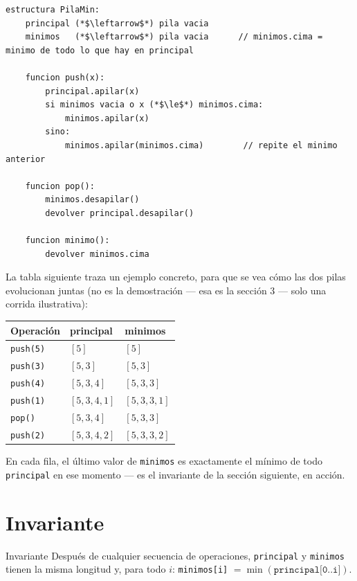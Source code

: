 \documentclass[11pt]{article}
\begin{document}
\begin{lstlisting}[style=pseudo]
estructura PilaMin:
    principal (*$\leftarrow$*) pila vacia
    minimos   (*$\leftarrow$*) pila vacia      // minimos.cima = minimo de todo lo que hay en principal

    funcion push(x):
        principal.apilar(x)
        si minimos vacia o x (*$\le$*) minimos.cima:
            minimos.apilar(x)
        sino:
            minimos.apilar(minimos.cima)        // repite el minimo anterior

    funcion pop():
        minimos.desapilar()
        devolver principal.desapilar()

    funcion minimo():
        devolver minimos.cima
\end{lstlisting}

La tabla siguiente traza un ejemplo concreto, para que se vea cómo las dos pilas evolucionan juntas (no
es la demostración --- esa es la sección 3 --- solo una corrida ilustrativa):

\begin{center}
\begin{tabular}{@{}lll@{}}
\toprule
\textbf{Operación} & \textbf{principal} & \textbf{minimos} \\
\midrule
\texttt{push(5)} & $[5]$ & $[5]$ \\
\texttt{push(3)} & $[5,3]$ & $[5,3]$ \\
\texttt{push(4)} & $[5,3,4]$ & $[5,3,3]$ \\
\texttt{push(1)} & $[5,3,4,1]$ & $[5,3,3,1]$ \\
\texttt{pop()} & $[5,3,4]$ & $[5,3,3]$ \\
\texttt{push(2)} & $[5,3,4,2]$ & $[5,3,3,2]$ \\
\bottomrule
\end{tabular}
\end{center}

En cada fila, el último valor de \texttt{minimos} es exactamente el mínimo de todo \texttt{principal} en
ese momento --- es el invariante de la sección siguiente, en acción.

\section{Invariante}

\begin{resultado}{Invariante}
Después de cualquier secuencia de operaciones, \texttt{principal} y \texttt{minimos} tienen la misma
longitud y, para todo $i$: \texttt{minimos[i]} $=\min(\texttt{principal[0..i]})$.
\end{resultado}
\end{document}
